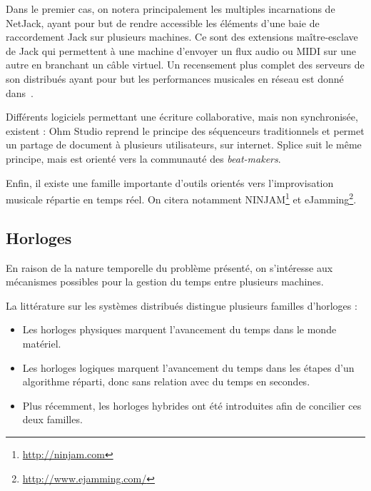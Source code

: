 \documentclass{article}
\begin{document}
Dans le premier cas, on notera principalement les multiples incarnations de NetJack\cite{carot2009netjack}, 
ayant pour but de rendre accessible les éléments d'une baie de raccordement Jack sur plusieurs machines. 
Ce sont des extensions maître-esclave de Jack qui permettent à une machine d'envoyer un flux audio ou MIDI sur une autre en branchant un câble virtuel.
Un recensement plus complet des serveurs de son distribués ayant pour but les performances musicales en réseau est donné dans~\cite{carot2007networked}. 

Différents logiciels permettant une écriture collaborative, mais non synchronisée, existent : 
Ohm Studio\cite{koszolko2015crowdsourcing} reprend le principe des séquenceurs traditionnels et permet un partage de document à plusieurs utilisateurs, sur internet.
Splice\cite{pignato2015deterritorialized} suit le même principe, mais est orienté vers la communauté des \emph{beat-makers}.

Enfin, il existe une famille importante d'outils orientés vers l'improvisation musicale répartie en temps réel\cite{mills2010dislocated}. 
On citera notamment NINJAM\footnote{\url{http://ninjam.com}} et eJamming\footnote{\url{http://www.ejamming.com/}}.


\subsection{Horloges}
En raison de la nature temporelle du problème présenté, on s'intéresse aux mécanismes possibles pour la gestion du temps entre plusieurs machines.

La littérature sur les systèmes distribués distingue plusieurs familles d'horloges : 
\begin{itemize}
    \item Les horloges physiques marquent l'avancement du temps dans le monde matériel.
    \item Les horloges logiques marquent l'avancement du temps dans les étapes d'un algorithme réparti, donc sans relation avec du temps en secondes.
    \item Plus récemment, les horloges hybrides ont été introduites afin de concilier ces deux familles.
\end{itemize}
\end{document}
